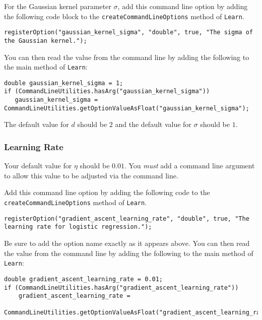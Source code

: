 \documentclass[11pt]{article}
\newcommand{\code}[1]{{\footnotesize \tt #1}}
\begin{document}
For the Gaussian kernel parameter $\sigma$, add this command line option by adding the following code block to the \code{createCommandLineOptions} method of \code{Learn}.

\begin{footnotesize}
\begin{verbatim}
registerOption("gaussian_kernel_sigma", "double", true, "The sigma of the Gaussian kernel.");
\end{verbatim}
\end{footnotesize}

You can then read the value from the command line by adding the following to the main method of \code{Learn}:
\begin{footnotesize}
\begin{verbatim}
double gaussian_kernel_sigma = 1;
if (CommandLineUtilities.hasArg("gaussian_kernel_sigma"))
   gaussian_kernel_sigma = CommandLineUtilities.getOptionValueAsFloat("gaussian_kernel_sigma");
\end{verbatim}
\end{footnotesize}

The default value for $d$ should be $2$ and the default value for $\sigma$ should be $1$.





\subsubsection{Learning Rate}
\label{sec:learning_rate}
Your default value for $\eta$ should be $0.01$. You \emph{must} add a command line argument to allow this value to be adjusted via the command line. 

Add this command line option by adding the following code to the \code{createCommandLineOptions} method of \code{Learn}.
\begin{footnotesize}
\begin{verbatim}
registerOption("gradient_ascent_learning_rate", "double", true, "The learning rate for logistic regression.");
\end{verbatim}
\end{footnotesize}

Be sure to add the option name exactly as it appears above. 
You can then read the value from the command line by adding the following to the main method of \code{Learn}:
\begin{footnotesize}
\begin{verbatim}
double gradient_ascent_learning_rate = 0.01;
if (CommandLineUtilities.hasArg("gradient_ascent_learning_rate"))
    gradient_ascent_learning_rate = 
        CommandLineUtilities.getOptionValueAsFloat("gradient_ascent_learning_rate");
\end{verbatim}
\end{footnotesize}
\end{document}
